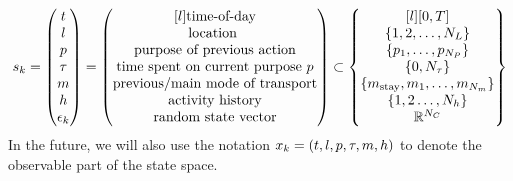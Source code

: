 \begin{equation}
    \s{k} = \begin{pmatrix}
    t \\
    l \\
    p \\
    \atime\\
    m \\
    \amem \\
    \epsilon_k
    \end{pmatrix} =
    \begin{pmatrix*}[l]
    \text{time-of-day} \\
    \text{location } \\
    \text{purpose of previous action} \\
    \text{time spent on current purpose $p$} \\
    \text{previous/main mode of transport} \\
    \text{activity history} \\
    \text{random state vector}
    \end{pmatrix*}
    \subset
    \begin{Bmatrix*}[l]
    [0,T] \\
    \{1,2,\dots, N_L\} \\
    \{p_1,\dots,p_{N_P}\} \\
    \{0,N_{\atime}\} \\
    \{m_{\text{stay}},m_1,\dots,m_{N_m}\} \\
    \{1,2\dots,{N_\amem} \}\\
    \rr^{N_C}
    \end{Bmatrix*}
\end{equation}
In the future, we will also use the notation $x_k=(t,l,p,\tau,m,h)$ to denote the observable part of the state space.
